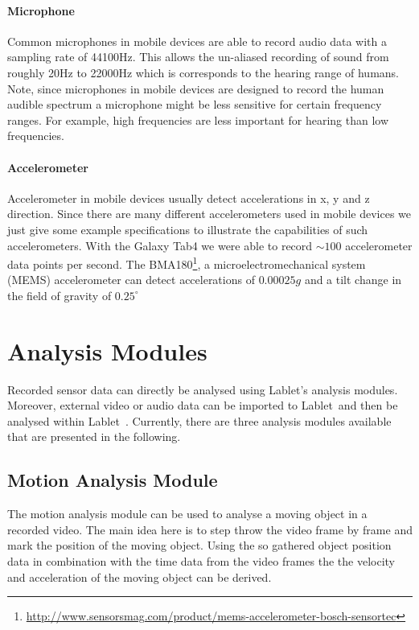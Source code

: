 \documentclass{sigchi}
\newcommand{\lablet}{Lablet\ }
\begin{document}
\paragraph{Microphone}
Common microphones in mobile devices are able to record audio data with a sampling rate of 44100Hz.
This allows the un-aliased recording of sound from roughly 20Hz to 22000Hz which is corresponds to the hearing range of humans.
Note, since microphones in mobile devices are designed to record the human audible spectrum a microphone might be less sensitive for certain frequency ranges.
For example, high frequencies are less important for hearing than low frequencies.

\paragraph{Accelerometer}
Accelerometer in mobile devices usually detect accelerations in x, y and z direction.
Since there are many different accelerometers used in mobile devices we just give some example specifications to illustrate the capabilities of such accelerometers.
With the Galaxy Tab4 we were able to record $\sim100$ accelerometer data points per second.
The BMA180\footnote{\url{http://www.sensorsmag.com/product/mems-accelerometer-bosch-sensortec}}, a microelectromechanical system (MEMS) accelerometer can detect accelerations of $0.00025g$ and a tilt change in the field of gravity of $0.25^{\circ}$


\section{Analysis Modules}
Recorded sensor data can directly be analysed using Lablet's analysis modules.
Moreover, external video or audio data can be imported to \lablet and then be analysed within \lablet.
Currently, there are three analysis modules available that are presented in the following.

\subsection{Motion Analysis Module}
The motion analysis module can be used to analyse a moving object in a recorded video.
The main idea here is to step throw the video frame by frame and mark the position of the moving object.
Using the so gathered object position data in combination with the time data from the video frames the the velocity and acceleration of the moving object can be derived.
\end{document}
